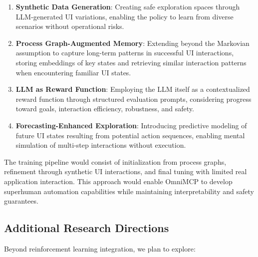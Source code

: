 \documentclass{article}
\begin{document}
\begin{enumerate}
    \item \textbf{Synthetic Data Generation}: Creating safe exploration spaces through LLM-generated UI variations, enabling the policy to learn from diverse scenarios without operational risks.
    
    \item \textbf{Process Graph-Augmented Memory}: Extending beyond the Markovian assumption to capture long-term patterns in successful UI interactions, storing embeddings of key states and retrieving similar interaction patterns when encountering familiar UI states.
    
    \item \textbf{LLM as Reward Function}: Employing the LLM itself as a contextualized reward function through structured evaluation prompts, considering progress toward goals, interaction efficiency, robustness, and safety.
    
    \item \textbf{Forecasting-Enhanced Exploration}: Introducing predictive modeling of future UI states resulting from potential action sequences, enabling mental simulation of multi-step interactions without execution.
\end{enumerate}

The training pipeline would consist of initialization from process graphs, refinement through synthetic UI interactions, and final tuning with limited real application interaction. This approach would enable OmniMCP to develop superhuman automation capabilities while maintaining interpretability and safety guarantees.

\subsection{Additional Research Directions}

Beyond reinforcement learning integration, we plan to explore:
\end{document}
